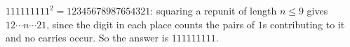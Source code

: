 $111111111^2=12345678987654321$: squaring a repunit of length $n\le9$ gives $12\cdots n\cdots21$, since the digit in each place counts the pairs of $1$s contributing to it and no carries occur. So the answer is $\boxed{111111111}$.
